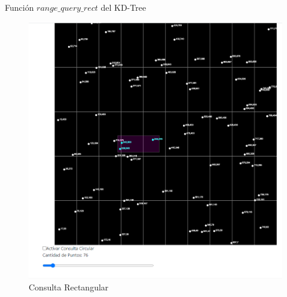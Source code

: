 \documentclass[11pt]{beamer}
\begin{document}
		\begin{frame}{Función $range\_query\_rect$ del KD-Tree}
			\justifying
			\begin{figure}[H]
				\centering
				\includegraphics[scale=0.25]{img/rectangular1.png}
				\caption{Consulta Rectangular}
				\label{fig:rangeQueryRect}
			\end{figure}
		\end{frame}
		
\end{document}
